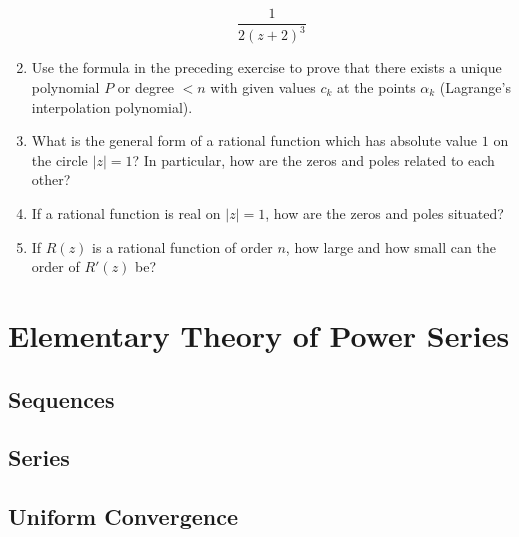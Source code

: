 \begin{enumerate}
\[  \frac{1}{2(z + 2)^3}
  \]
\item
  Use the formula in the preceding exercise to prove that there exists a
  unique polynomial \(P\) or degree \(< n\) with given values \(c_k\) at the
  points \(\alpha_k\) (Lagrange's interpolation polynomial).
\item
  What is the general form of a rational function which has absolute value
  \(1\) on the circle \(\lvert z\rvert = 1\)?
  In particular, how are the zeros and poles related to each other?
\item
  If a rational function is real on \(\lvert z\rvert = 1\), how are the zeros
  and poles situated?
\item
  If \(R(z)\) is a rational function of order \(n\), how large and how small
  can the order of \(R'(z)\) be?
\end{enumerate}

\section{Elementary Theory of Power Series}

\subsection{Sequences}

\subsection{Series}

\subsection{Uniform Convergence}

